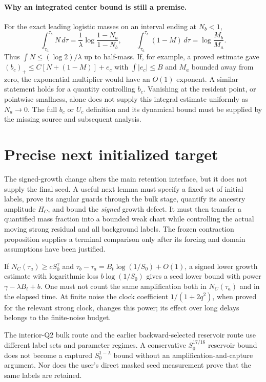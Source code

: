 \documentclass[11pt]{article}
\numberwithin{equation}{section}
\theoremstyle{remark}\newtheorem{remark}[theorem]{Remark}
\newcommand{\dd}{\,d}
\newcommand{\1}{\mathbf1}
\begin{document}
\paragraph{Why an integrated center bound is still a premise.}
For the exact leading logistic masses on an interval ending at $N_b<1$,
\begin{equation}\label{inc:SGWR:v1:logisticintegrals}
 \int_{\tau_a}^{\tau_b}N\dd\tau
 =\frac1\lambda\log\frac{1-N_a}{1-N_b},\qquad
 \int_{\tau_a}^{\tau_b}(1-M)\dd\tau=\log\frac{M_b}{M_a}.
\end{equation}
Thus $\int N\le(\log2)/\lambda$ up to half-mass. If, for example, a
proved estimate gave
$(b_c)_+\le C[N+(1-M)]+e_c$ with $\int|e_c|\le B$ and $M_a$ bounded
away from zero, the exponential multiplier would have an $O(1)$ exponent.
A similar statement holds for a quantity controlling $b_c$.
Vanishing at the resident point, or pointwise smallness, alone does not
supply this integral estimate uniformly as $N_a\to0$. The full $b_c$ or
$U_c$ definition and its dynamical bound must be supplied by the missing
source and subsequent analysis.

\section{Precise next initialized target}
The signed-growth change alters the main retention interface, but it does
not supply the final seed. A useful next lemma must specify a fixed set of
initial labels, prove its angular guards through the bulk stage, quantify
its ancestry amplitude $H_C$, and bound the \emph{signed} growth defect.
It must then transfer a quantified mass fraction into a bounded weak chart
while controlling the actual moving strong residual and all background
labels. The frozen contraction proposition supplies a terminal comparison
only after its forcing and domain assumptions have been justified.

If $N_C(\tau_a)\ge cS_0^\gamma$ and
$\tau_b-\tau_a=B_t\log(1/S_0)+O(1)$, a signed lower growth estimate
with logarithmic loss $b\log(1/S_0)$ gives a seed lower bound with power
$\gamma-\lambda B_t+b$. One must not count the same amplification both in
$N_C(\tau_a)$ and in the elapsed time. At finite noise the clock coefficient
$1/(1+2q^2)$, when proved for the relevant strong clock, changes this power;
its effect over long delays belongs to the finite-noise budget.

The interior-Q2 bulk route and the earlier backward-selected reservoir
route use different label sets and parameter regimes. A conservative
$S_0^{17/16}$ reservoir bound does not become a captured
$S_0^{1-\lambda}$ bound without an amplification-and-capture argument.
Nor does the user's direct masked seed measurement prove that the same
labels are retained.
\end{document}
